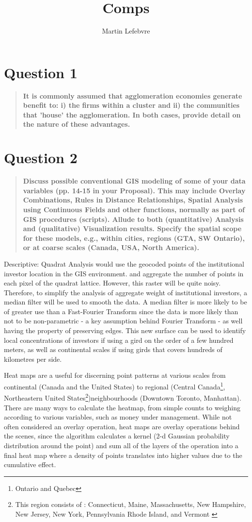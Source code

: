 \documentclass[12pt,letterpaper,notitlepage,onecolumn,final,openbib]{article}
\author{Martin Lefebvre}
\title{Comps}
\begin{document}
	
\section{Question 1}
\begin{quotation}
\textbf{It is commonly assumed that agglomeration economies generate benefit to: i) the firms within a cluster and ii) the communities that 'house' the agglomeration. In both cases, provide detail on the nature of these advantages.}
\end{quotation}
\section{Question 2}
\begin{quotation}
\textbf{Discuss possible conventional GIS modeling of some of your data variables (pp. 14-15 in your Proposal). This may include Overlay Combinations, Rules in Distance Relationships, Spatial Analysis using Continuous Fields and other functions, normally as part of GIS procedures (scripts). Allude to both (quantitative) Analysis and (qualitative) Visualization results. Specify the spatial scope for these models, e.g., within cities, regions (GTA, SW Ontario), or at coarse scales (Canada, USA, North America).}
\end{quotation}

Descriptive:
Quadrat Analysis would use the geocoded points of the institutional investor location in the GIS environment. and aggregate the number of points in each pixel of the quadrat lattice.  However, this raster will be quite noisy.  Therefore, to simplify the analysis of aggregate weight of institutional investors, a median filter will be used to smooth the data.  A median filter is more likely to be of greater use than a Fast-Fourier Transform since the data is more likely than not to be non-parametric - a key assumption behind Fourier Transform - as well having the property of preserving edges.  This new surface can be used to identify local concentrations of investors if using a gird on the order of a few hundred meters, as well as continental scales if using girds that covers hundreds of kilometres per side.   


Heat maps are a useful for discerning point patterns at various scales from continental (Canada and the United States) to regional (Central Canada\footnote{Ontario and Quebec}, Northeastern United States\footnote{This region consists of : Connecticut, Maine, Massachusetts, New Hampshire, New Jersey, New York, Pennsylvania Rhode Island, and Vermont \cite{Census2010_div}})neighbourhoods (Downtown Toronto, Manhattan).  There are many ways to calculate the heatmap, from simple counts to weighing according to various variables, such as money under management.   While not often considered an overlay operation, heat maps are overlay operations behind the scenes, since the algorithm calculates a kernel (2-d Gaussian probability distribution around the point) and sum all of the layers of the operation into a final heat map where a density of points translates into higher values due to the cumulative effect.  
\end{document}
